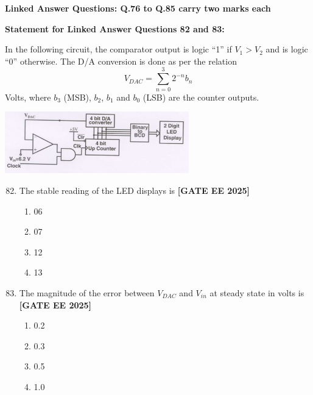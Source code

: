 \documentclass[12pt,a4paper]{article}
\begin{document}
\vspace{1em}
\item \textbf{Linked Answer Questions: Q.76 to Q.85 carry two marks each}
\item \textbf{Statement for Linked Answer Questions 82 and 83: }
\vspace{1em}
\newline
\item In the following circuit, the comparator output is logic “1” if $V_1 > V_2$ and is logic “0” otherwise. The D/A conversion is done as per the relation
\[
V_{DAC} = \sum_{n=0}^3 2^{-n} b_n
\]
Volts, where $b_3$ (MSB), $b_2$, $b_1$ and $b_0$ (LSB) are the counter outputs.
\begin{center}
\includegraphics[width=0.6\textwidth]{figs/q8283.png}
\end{center}

\begin{enumerate}[leftmargin=*, label=\textbf{Q.\arabic*:}]
\setcounter{enumi}{81}

\item The stable reading of the LED displays is
\newline
\noindent \textbf{[GATE EE 2025]}
\begin{enumerate}[label=(\Alph*)]
  \item 06
  \item 07
  \item 12
  \item 13
\end{enumerate}

\item The magnitude of the error between $V_{DAC}$ and $V_{in}$ at steady state in volts is
\newline
\noindent \textbf{[GATE EE 2025]}
\begin{enumerate}[label=(\Alph*)]
  \item 0.2
  \item 0.3
  \item 0.5
  \item 1.0
\end{enumerate}

\end{enumerate}
\end{document}
